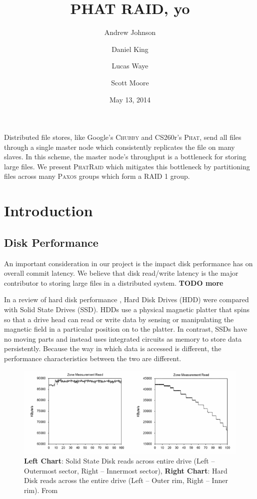 \documentclass[10pt,letter]{article}
\newcommand{\chubby}[0]{\textsc{Chubby}}
\newcommand{\phat}[0]{\textsc{Phat}}
\newcommand{\phatraid}[0]{\textsc{PhatRaid}}
\newcommand{\raid}[1]{\textsc{RAID #1}}
\newcommand{\paxos}[0]{\textsc{Paxos}}
\begin{document}
\title{PHAT RAID, yo}
\author{Andrew Johnson \and Daniel King \and Lucas Waye \and Scott Moore}
\date{May 13, 2014}

\maketitle

Distributed file stores, like Google's \chubby{} and CS260r's \phat{}, send all
files through a single master node which consistently replicates the file on
many slaves. In this scheme, the master node's throughput is a bottleneck for
storing large files. We present \phatraid{} which mitigates this bottleneck by
partitioning files across many \paxos{} groups which form a \raid{1} group.

\section{Introduction}

\subsection{Disk Performance}

An important consideration in our project is the impact disk performance has on overall commit latency. We believe that disk read/write latency is the major contributor to storing large files in a distributed system. {\bf TODO more}

In a review of hard disk performance \cite{disk-perf}, Hard Disk Drives (HDD) were compared with Solid State Drives (SSD). HDDs use a physical magnetic platter that spins so that a drive head can read or write data by sensing or manipulating the magnetic field in a particular position on to the platter. In contrast, SSDs have no moving parts and instead uses integrated circuits as memory to store data persistently. Because the way in which data is accessed is different, the performance characteristics between the two are different.

\begin{figure}
\centering
\includegraphics[width=\textwidth]{disk-perf}
\caption{{\bf Left Chart}: Solid State Disk reads across entire drive (Left -- Outermost sector, Right -- Innermost sector), {\bf Right Chart}: Hard Disk reads across the entire drive (Left -- Outer rim, Right -- Inner rim). From \cite{disk-perf}}
\label{fig:hdd-vs-sdd}
\end{figure}
\end{document}
